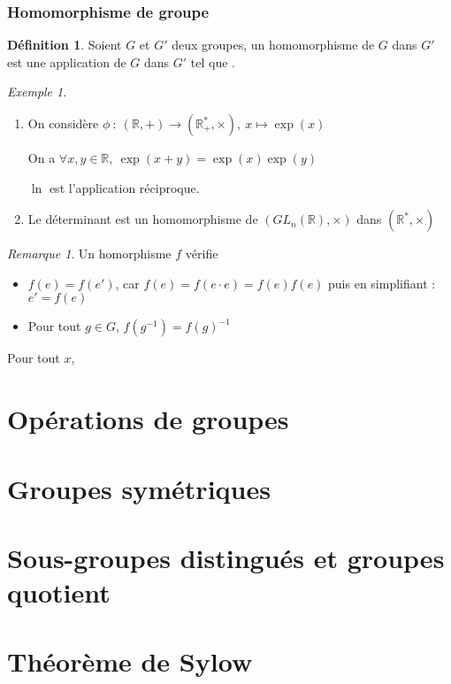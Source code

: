\documentclass[]{article}
\theoremstyle{remark}
\newtheorem{myrem}{Remarque}
\newtheorem{myexmpl}{Exemple}
\theoremstyle{definition}
\newtheorem{mydef}{Définition}
\newcommand{\funcinline}[5]{
#1 ~ : ~ #2 \longrightarrow #3, ~ #4 \longmapsto #5
}
\begin{document}
\section{Homomorphisme de groupe}

\begin{mydef}
	Soient $G$ et $G'$ deux groupes, un homomorphisme de $G$ dans $G'$ est une application de $G$ dans $G'$ tel que .
\end{mydef}

\begin{myexmpl}
	\leavevmode
	\begin{enumerate}
		\item On considère $\funcinline{\phi}{(\mathbb{R}, +)}{(\mathbb{R}^*_+, \times)}{x}{\exp(x)}$
		
		On a $\forall x, y \in \mathbb{R}, ~ \exp(x+y)=\exp(x)\exp(y)$
		
		$\ln$ est l'application réciproque.
		
		\item Le déterminant est un homomorphisme de $(GL_n(\mathbb{R}), \times)$ dans $(\mathbb{R}^*, \times)$
	\end{enumerate}
\end{myexmpl}

\begin{myrem}
	Un homorphisme $f$ vérifie 
	\begin{itemize}
		\item $f(e)=f(e')$, car $f(e)=f(e \cdot e)=f(e)f(e)$ puis en simplifiant : $e' = f(e)$
		\item Pour tout $g \in G$, $f(g^{-1})=f(g)^{-1}$
	\end{itemize}
	Pour tout $x$, 
\end{myrem}

\part{Opérations de groupes}
\part{Groupes symétriques}
\part{Sous-groupes distingués et groupes quotient}
\part{Théorème de Sylow}
\end{document}
